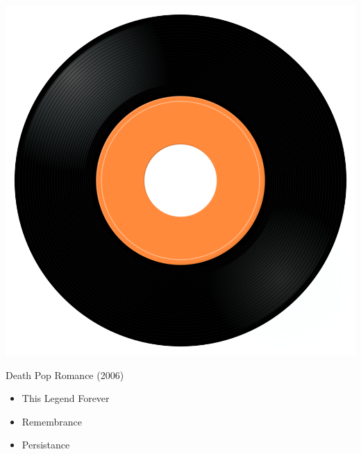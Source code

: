 \begin{minipage}[t]{0.25\textwidth}\vspace{0pt}
\captionsetup{type=figure}
\includegraphics[width=\textwidth]{Images/cover.png}
\caption*{Death Pop Romance (2006)}
\end{minipage}
\begin{minipage}[t]{0.25\textwidth}\vspace{0pt}
\begin{itemize}[nosep,leftmargin=1em,labelwidth=*,align=left]
	\setlength{\itemsep}{0pt}
	\item This Legend Forever
	\item Remembrance
	\item Persistance
\end{itemize}
\end{minipage}
